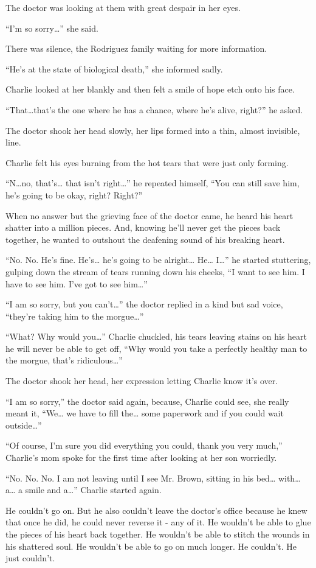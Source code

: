 The doctor was looking at them with great despair in her eyes.

“I'm so sorry…” she said.

There was silence, the Rodriguez family waiting for more information.

“He's at the state of biological death,” she informed sadly.

Charlie looked at her blankly and then felt a smile of hope etch onto his face.

“That…that's the one where he has a chance, where he's alive, right?” he asked.

The doctor shook her head slowly, her lips formed into a thin, almost invisible, line.

Charlie felt his eyes burning from the hot tears that were just only forming.

“N…no, that's… that isn't right…” he repeated himself, “You can still save him, he's going to be okay, right? Right?”

When no answer but the grieving face of the doctor came, he heard his heart shatter into a million pieces. And, knowing he'll never get the pieces back together, he wanted to outshout the deafening sound of his breaking heart.

“No. No. He's fine. He's… he's going to be alright… He… I…” he started stuttering, gulping down the stream of tears running down his cheeks, “I want to see him. I have to see him. I've got to see him…”

“I am so sorry, but you can't…” the doctor replied in a kind but sad voice, “they're taking him to the morgue…”

“What? Why would you…” Charlie chuckled, his tears leaving stains on his heart he will never be able to get off, “Why would you take a perfectly healthy man to the morgue, that's ridiculous…”

The doctor shook her head, her expression letting Charlie know it's over.

“I am so sorry,” the doctor said again, because, Charlie could see, she really meant it, “We… we have to fill the… some paperwork and if you could wait outside…”

“Of course, I'm sure you did everything you could, thank you very much,” Charlie's mom spoke for the first time after looking at her son worriedly.

“No. No. No. I am not leaving until I see Mr. Brown, sitting in his bed… with… a… a smile and a…” Charlie started again.

He couldn't go on. But he also couldn't leave the doctor's office because he knew that once he did, he could never reverse it - any of it. He wouldn't be able to glue the pieces of his heart back together. He wouldn't be able to stitch the wounds in his shattered soul. He wouldn't be able to go on much longer. He couldn't. He just couldn't.


